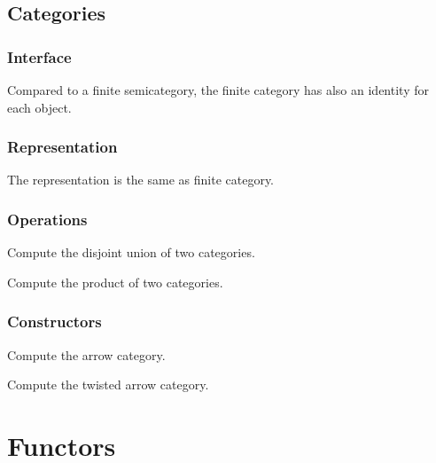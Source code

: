 \begin{exercise}
\section{Categories}
\subsection*{Interface}
Compared to a finite semicategory, the finite category
has also an identity for each object.

\subsection*{Representation}

The representation is the same as finite category.

\subsection*{Operations}

\begin{exercise}
Compute the disjoint union of two categories.

\end{exercise}

\begin{exercise}
Compute the product of two categories.

\end{exercise}


\subsection*{Constructors}


\begin{exercise}
Compute the arrow category.

\end{exercise}


\begin{exercise}
Compute the twisted arrow category.

\end{exercise}


\chapter{Functors}



\end{exercise}

